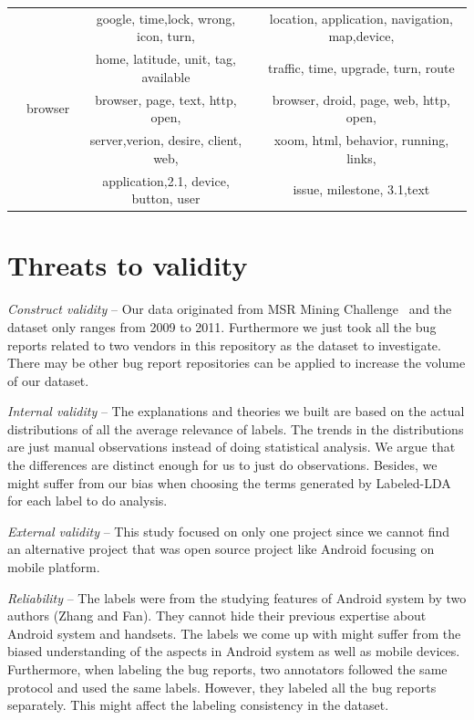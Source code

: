 \documentclass[10pt, conference, compsocconf]{IEEEtran}
\begin{document}
\begin{table}[!htb]
\begin{tabular}{|c||c||c||c|}
&&google, time,lock, wrong, icon, turn, & location, application, navigation, map,device, \\

&&home, latitude, unit, tag, available & traffic, time, upgrade, turn, route\\ \cline{2-4}

    &browser& browser, page, text, http, open, & browser, droid, page, web, http, open, \\
    &&server,verion, desire, client, web, & xoom, html, behavior, running, links, \\
&& application,2.1, device, button, user  & issue, milestone, 3.1,text \\
\hline
\end{tabular}
\end{table}

\section{Threats to validity}
\label{sec:threats}

\textit{Construct validity} – Our data originated from MSR Mining Challenge~\cite{MSRChallenge2012} and the dataset only ranges from 2009 to 2011. Furthermore we just took all the bug reports related to two vendors in this repository as the dataset to investigate. There may be other bug report repositories can be applied to increase the volume of our dataset. 

\textit{Internal validity} – The explanations and theories we built are based on the actual distributions of all the  average relevance of labels. The trends in the distributions are just manual observations instead of doing statistical analysis. We argue that the differences are distinct enough for us to just do observations. Besides, we might suffer from our bias when choosing the terms generated by Labeled-LDA for each label to do analysis. 

\textit{External validity} – This study focused on only one project since we cannot find an alternative project that was open source project like Android focusing on mobile platform.

\textit{Reliability} – The labels were from the studying features of Android system by two authors (Zhang and Fan). They cannot hide their previous expertise about Android system and handsets. The labels we come up with might suffer from the biased understanding of the aspects in Android system as well as mobile devices. Furthermore, when labeling the bug reports, two annotators followed the same protocol and used the same labels. However, they labeled all the bug reports separately. This might affect the labeling consistency in the dataset. 
\end{document}
